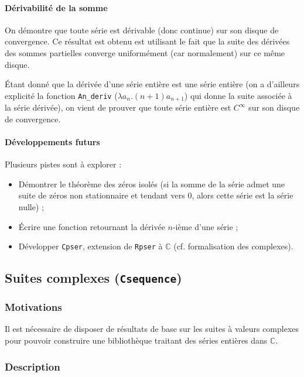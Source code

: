 \documentclass[a4paper,10pt]{article}
\newcommand{\coqcode}[1]{\texttt{#1}}
\begin{document}
\paragraph{Dérivabilité de la somme} On démontre que toute série est dérivable (donc continue) sur son disque de convergence. Ce résultat est obtenu est utilisant le fait que la suite des dérivées des sommes partielles converge uniformément (car normalement) sur ce même disque.

Étant donné que la dérivée d'une série entière est une série entière (on a d'ailleurs explicité la fonction \coqcode{An\_deriv} ($\lambda a_n.(n+1)a_{n+1}$) qui donne la suite associée à la série dérivée), on vient de prouver que toute série entière est $C^{\infty}$ sur son disque de convergence.

\paragraph{Développements futurs}

Plusieurs pistes sont à explorer :

\begin{itemize}
 \item Démontrer le théorème des zéros isolés (si la somme de la série admet une suite de zéros non stationnaire et tendant vers $0$, alors cette série est la série nulle) ;
 \item Écrire une fonction retournant la dérivée $n$-ième d'une série ;
 \item Développer \coqcode{Cpser}, extension de \coqcode{Rpser} à $\mathbb{C}$ (cf. formalisation des complexes).
\end{itemize}

\subsection{Suites complexes (\coqcode{Csequence})}

\subsubsection{Motivations}

Il est nécessaire de disposer de résultats de base sur les suites à valeurs complexes pour pouvoir construire une bibliothèque traitant des séries entières dans $\mathbb{C}$.

\subsubsection{Description}
\end{document}
